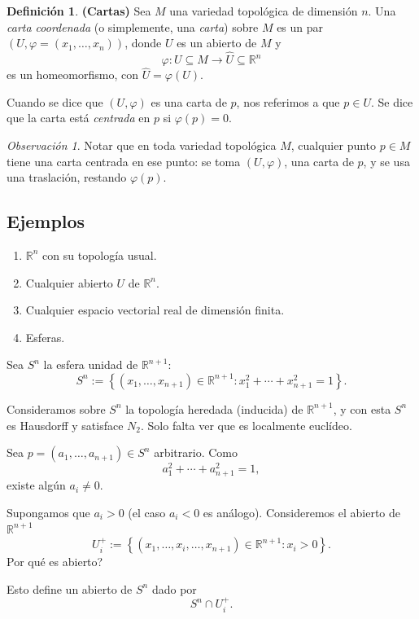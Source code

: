 \documentclass[11pt]{article}
\theoremstyle{definition}
\newtheorem*{definition}{Definici\'on}
\theoremstyle{remark}
\newtheorem*{remark}{Observaci\'on}
\begin{document}
\begin{definition}
\textbf{(Cartas)}\;
Sea $M$ una variedad topol\'ogica de dimensi\'on $n$. Una \emph{carta coordenada} (o simplemente, una \emph{carta}) sobre $M$ es un par $(U,\varphi=(x_1,\dots,x_n))$, donde $U$ es un abierto de $M$ y
\[
\varphi:U\subseteq M\longrightarrow \widehat U\subseteq \mathbb{R}^n
\]
es un homeomorfismo, con $\widehat U=\varphi(U)$.
\end{definition}

Cuando se dice que $(U,\varphi)$ es una carta de $p$, nos referimos a que $p\in U$. Se dice que la carta est\'a \emph{centrada} en $p$ si $\varphi(p)=0$.

\begin{remark}
Notar que en toda variedad topol\'ogica $M$, cualquier punto $p\in M$ tiene una carta centrada en ese punto: se toma $(U,\varphi)$, una carta de $p$, y se usa una traslaci\'on, restando $\varphi(p)$.
\end{remark}

\subsection*{Ejemplos}

\begin{enumerate}
\item $\mathbb{R}^n$ con su topolog\'ia usual.
\item Cualquier abierto $U$ de $\mathbb{R}^n$.
\item Cualquier espacio vectorial real de dimensi\'on finita.
\item Esferas.
\end{enumerate}

Sea $S^n$ la esfera unidad de $\mathbb{R}^{n+1}$:
\[
S^n:=\left\{(x_1,\dots,x_{n+1})\in \mathbb{R}^{n+1}:x_1^2+\cdots+x_{n+1}^2=1\right\}.
\]

Consideramos sobre $S^n$ la topolog\'ia heredada (inducida) de $\mathbb{R}^{n+1}$, y con esta $S^n$ es Hausdorff y satisface $N_2$. Solo falta ver que es localmente eucl\'ideo.

Sea $p=(a_1,\dots,a_{n+1})\in S^n$ arbitrario. Como
\[
a_1^2+\cdots+a_{n+1}^2=1,
\]
existe alg\'un $a_i\neq 0$.

Supongamos que $a_i>0$ (el caso $a_i<0$ es an\'alogo). Consideremos el abierto de $\mathbb{R}^{n+1}$
\[
U_i^+:=\left\{(x_1,\dots,x_i,\dots,x_{n+1})\in \mathbb{R}^{n+1}:x_i>0\right\}.
\]
\textquestiondown Por qu\'e es abierto?

Esto define un abierto de $S^n$ dado por
\[
S^n\cap U_i^+.
\]
\end{document}
